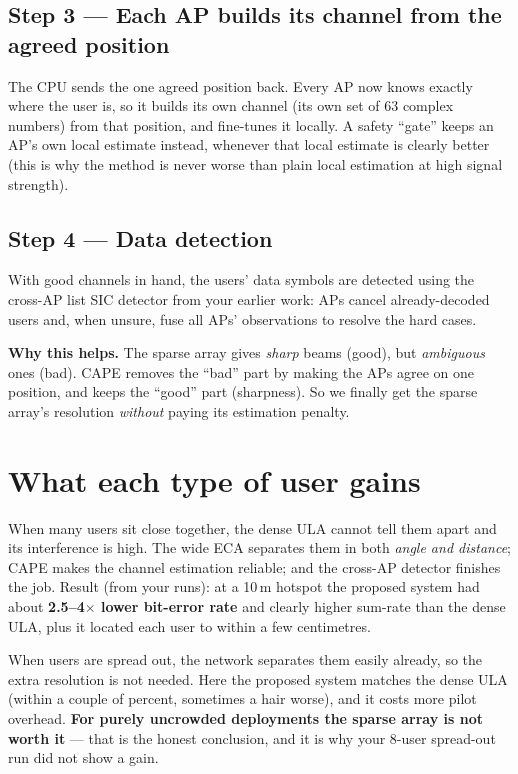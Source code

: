 \documentclass[11pt]{article}
\begin{document}
\subsection*{Step 3 --- Each AP builds its channel from the agreed position}
The CPU sends the one agreed position back. Every AP now knows exactly where the user is, so it
builds its own channel (its own set of 63 complex numbers) from that position, and fine-tunes it
locally. A safety ``gate'' keeps an AP's own local estimate instead, whenever that local estimate
is clearly better (this is why the method is never worse than plain local estimation at high
signal strength).

\subsection*{Step 4 --- Data detection}
With good channels in hand, the users' data symbols are detected using the cross-AP list SIC
detector from your earlier work: APs cancel already-decoded users and, when unsure, fuse all APs'
observations to resolve the hard cases.

\begin{goodbox}
\textbf{Why this helps.} The sparse array gives \emph{sharp} beams (good), but \emph{ambiguous}
ones (bad). CAPE removes the ``bad'' part by making the APs agree on one position, and keeps the
``good'' part (sharpness). So we finally get the sparse array's resolution \emph{without} paying
its estimation penalty.
\end{goodbox}

\section{What each type of user gains}

\begin{description}[leftmargin=0pt,itemsep=4pt]
\item[\textcolor{BrickRed}{\textbf{Crowded users --- the big winners.}}] When many users sit close
  together, the dense ULA cannot tell them apart and its interference is high. The wide ECA
  separates them in both \emph{angle and distance}; CAPE makes the channel estimation reliable;
  and the cross-AP detector finishes the job. Result (from your runs): at a 10\,m hotspot the
  proposed system had about \textbf{2.5--4$\times$ lower bit-error rate} and clearly higher
  sum-rate than the dense ULA, plus it located each user to within a few centimetres.
\item[\textcolor{ForestGreen}{\textbf{Uncrowded users --- roughly a tie.}}] When users are spread
  out, the network separates them easily already, so the extra resolution is not needed. Here the
  proposed system matches the dense ULA (within a couple of percent, sometimes a hair worse), and
  it costs more pilot overhead. \textbf{For purely uncrowded deployments the sparse array is not
  worth it} --- that is the honest conclusion, and it is why your 8-user spread-out run did not
  show a gain.
\end{description}
\end{document}
